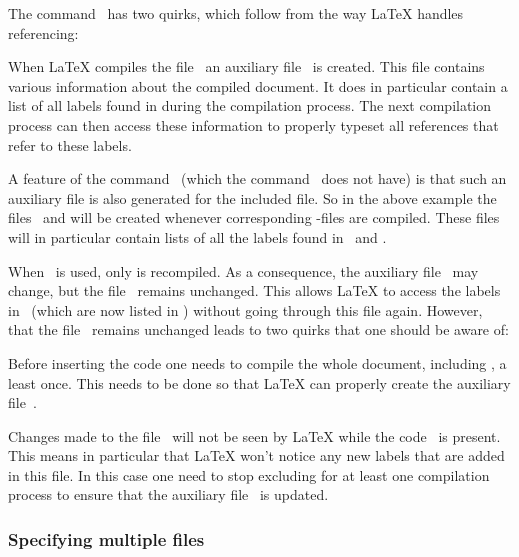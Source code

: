 The command~ has two quirks, which follow from the way {\LaTeX} handles referencing:

When {\LaTeX} compiles the file~ an auxiliary file~ is created.
This file contains various information about the compiled document.
It does in particular contain a list of all labels found in  during the compilation process.
The next compilation process can then access these information to properly typeset all references that refer to these labels.

A feature of the command~ (which the command~ does not have) is that such an auxiliary file is also generated for the included file.
So in the above example the files~ and  will be created whenever corresponding -files are compiled.
These files will in particular contain lists of all the labels found in~ and .


When~ is used, only  is recompiled.
As a consequence, the auxiliary file~ may change, but the file~ remains unchanged.
This allows {\LaTeX} to access the labels in~ (which are now listed in ) without going through this file again.
However, that the file~ remains unchanged leads to two quirks that one should be aware of:
\begin{myitemize}
  \item
    Before inserting the code  one needs to compile the whole document, including , a least once.
    This needs to be done so that {\LaTeX} can properly create the auxiliary file~.
  \item
    Changes made to the file~ will not be seen by {\LaTeX} while the code~ is present.
    This means in particular that {\LaTeX} won’t notice any new labels that are added in this file.
    In this case one need to stop excluding  for at least one compilation process to ensure that the auxiliary file~ is updated.
\end{myitemize}

\subsubsection{Specifying multiple files}

